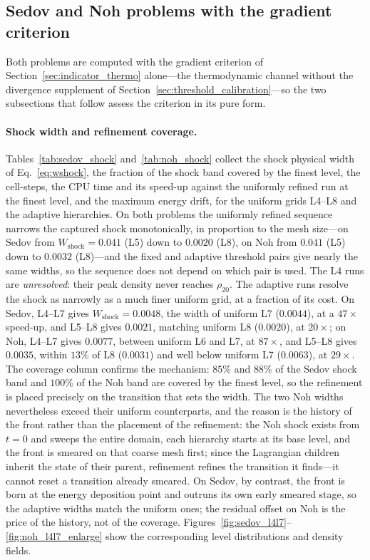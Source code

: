 \documentclass[a4paper]{cas-sc}
\begin{document}
\subsection{Sedov and Noh problems with the gradient criterion}
\label{sec:sedov}

Both problems are computed with the gradient criterion of
Section~\ref{sec:indicator_thermo} alone---the thermodynamic channel without
the divergence supplement of Section~\ref{sec:threshold_calibration}---so the
two subsections that follow assess the criterion in its pure form.

\paragraph{Shock width and refinement coverage.}
Tables~\ref{tab:sedov_shock} and~\ref{tab:noh_shock} collect the shock
physical width of Eq.~\eqref{eq:wshock}, the fraction of the shock band
covered by the finest level, the cell-steps, the CPU time and its speed-up
against the uniformly refined run at the finest level, and the maximum
energy drift, for the uniform grids L4--L8 and the adaptive hierarchies. On
both problems the uniformly refined sequence narrows the captured shock
monotonically, in proportion to the mesh size---on Sedov from
$W_{\mathrm{shock}}=0.041$ (L5) down to $0.0020$ (L8), on Noh from $0.041$
(L5) down to $0.0032$ (L8)---and the fixed and adaptive threshold pairs give
nearly the same widths, so the sequence does not depend on which pair is
used. The L4 runs are \emph{unresolved}: their peak density never reaches
$\rho_{20}$. The adaptive runs resolve the shock as narrowly as a much finer
uniform grid, at a fraction of its cost. On Sedov, L4--L7 gives
$W_{\mathrm{shock}}=0.0048$, the width of uniform L7 ($0.0044$), at a
$47\times$ speed-up, and L5--L8 gives $0.0021$, matching uniform L8
($0.0020$), at $20\times$; on Noh, L4--L7 gives $0.0077$, between uniform
L6 and L7, at $87\times$, and L5--L8 gives $0.0035$, within $13\%$ of L8
($0.0031$) and well below uniform L7 ($0.0063$), at $29\times$. The coverage
column confirms the mechanism: $85\%$ and $88\%$ of the Sedov shock band and
$100\%$ of the Noh band are covered by the finest level, so the refinement is
placed precisely on the transition that sets the width.
The two Noh widths nevertheless exceed their uniform counterparts, and the
reason is the history of the front rather than the placement of the
refinement: the Noh shock exists from $t=0$ and sweeps the entire domain, each
hierarchy starts at its base level, and the front is smeared on that coarse
mesh first; since the Lagrangian children inherit the state of their parent,
refinement refines the transition it finds---it cannot reset a transition
already smeared. On Sedov, by contrast, the front is born at the energy
deposition point and outruns its own early smeared stage, so the adaptive
widths match the uniform ones; the residual offset on Noh is the price of the
history, not of the coverage.
Figures~\ref{fig:sedov_l4l7}--\ref{fig:noh_l4l7_enlarge} show the
corresponding level distributions and density fields.
\end{document}
